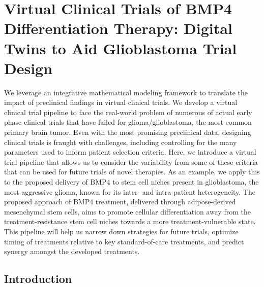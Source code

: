 \documentclass[
  letterpaper,
]{scrreprt}
\theoremstyle{definition}
\theoremstyle{remark}
\begin{document}

\chapter{Virtual Clinical Trials of BMP4 Differentiation Therapy:
Digital Twins to Aid Glioblastoma Trial
Design}\label{virtual-clinical-trials-of-bmp4-differentiation-therapy-digital-twins-to-aid-glioblastoma-trial-design}

We leverage an integrative mathematical modeling framework to translate
the impact of preclinical findings in virtual clinical trials. We
develop a virtual clinical trial pipeline to face the real-world problem
of numerous of actual early phase clinical trials that have failed for
glioma/glioblastoma, the most common primary brain tumor. Even with the
most promising preclinical data, designing clinical trials is fraught
with challenges, including controlling for the many parameters used to
inform patient selection criteria. Here, we introduce a virtual trial
pipeline that allows us to consider the variability from some of these
criteria that can be used for future trials of novel therapies. As an
example, we apply this to the proposed delivery of BMP4 to stem cell
niches present in glioblastoma, the most aggressive glioma, known for
its inter- and intra-patient heterogeneity. The proposed approach of
BMP4 treatment, delivered through adipose-derived mesenchymal stem
cells, aims to promote cellular differentiation away from the
treatment-resistance stem cell niches towards a more
treatment-vulnerable state. This pipeline will help us narrow down
strategies for future trials, optimize timing of treatments relative to
key standard-of-care treatments, and predict synergy amongst the
developed treatments.

\hfill\break

\section{Introduction}\label{sec-introduction}
\end{document}
